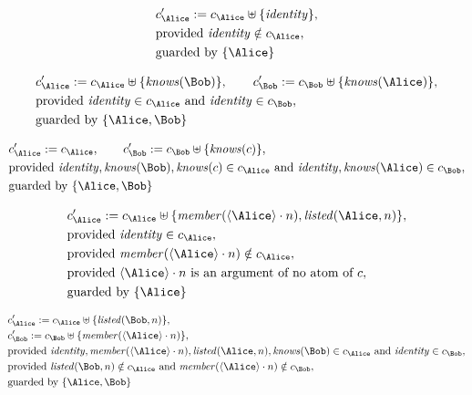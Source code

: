 \begin{align*}
&
c'_
{
\Alice
}
 := 
c_
{
\Alice
}
 \uplus 
\{
\mathit{
identity
}
\}
,\\
&
\text{provided } 
\mathit{
identity
}
 \notin c_
{
\Alice
}
,\\
&
\text{guarded by } \{
\Alice
\}
\end{align*}

\begin{align*}
&
c'_
{
\Alice
}
 := 
c_
{
\Alice
}
 \uplus 
\{
\mathit{
knows
}
(
\Bob
)
\}
, \qquad 
c'_
{
\Bob
}
 := 
c_
{
\Bob
}
 \uplus 
\{
\mathit{
knows
}
(
\Alice
)
\}
,\\
&
\text{provided } 
\mathit{
identity
}
 \in c_
{
\Alice
}
 \text{ and } 
\mathit{
identity
}
 \in c_
{
\Bob
}
,\\
&
\text{guarded by } \{
\Alice
,
\Bob
\}
\end{align*}

\begin{align*}
&
c'_
{
\Alice
}
 := 
c_
{
\Alice
}
, \qquad 
c'_
{
\Bob
}
 := 
c_
{
\Bob
}
 \uplus 
\{
\mathit{
knows
}
(
c
)
\}
,\\
&
\text{provided } 
\mathit{
identity
}
,
\mathit{
knows
}
(
\Bob
)
,
\mathit{
knows
}
(
c
)
 \in c_
{
\Alice
}
 \text{ and } 
\mathit{
identity
}
,
\mathit{
knows
}
(
\Alice
)
 \in c_
{
\Bob
}
,\\
&
\text{guarded by } \{
\Alice
,
\Bob
\}
\end{align*}

\begin{align*}
&
c'_
{
\Alice
}
 := 
c_
{
\Alice
}
 \uplus 
\{
\mathit{
member
}
(
\langle
\Alice
\rangle
\cdot
n
)
,
\mathit{
listed
}
(
\Alice
,
n
)
\}
,\\
&
\text{provided } 
\mathit{
identity
}
 \in c_
{
\Alice
}
,\\
&
\text{provided } 
\mathit{
member
}
(
\langle
\Alice
\rangle
\cdot
n
)
 \notin c_
{
\Alice
}
,\\
&
\text{provided } 
\langle
\Alice
\rangle
\cdot
n
 \text{ is an argument of no atom of } c
,\\
&
\text{guarded by } \{
\Alice
\}
\end{align*}

\begin{align*}
&
c'_
{
\Alice
}
 := 
c_
{
\Alice
}
 \uplus 
\{
\mathit{
listed
}
(
\Bob
,
n
)
\}
,\\
&
c'_
{
\Bob
}
 := 
c_
{
\Bob
}
 \uplus 
\{
\mathit{
member
}
(
\langle
\Alice
\rangle
\cdot
n
)
\}
,\\
&
\text{provided } 
\mathit{
identity
}
,
\mathit{
member
}
(
\langle
\Alice
\rangle
\cdot
n
)
,
\mathit{
listed
}
(
\Alice
,
n
)
,
\mathit{
knows
}
(
\Bob
)
 \in c_
{
\Alice
}
 \text{ and } 
\mathit{
identity
}
 \in c_
{
\Bob
}
,\\
&
\text{provided } 
\mathit{
listed
}
(
\Bob
,
n
)
 \notin c_
{
\Alice
}
 \text{ and } 
\mathit{
member
}
(
\langle
\Alice
\rangle
\cdot
n
)
 \notin c_
{
\Bob
}
,\\
&
\text{guarded by } \{
\Alice
,
\Bob
\}
\end{align*}
